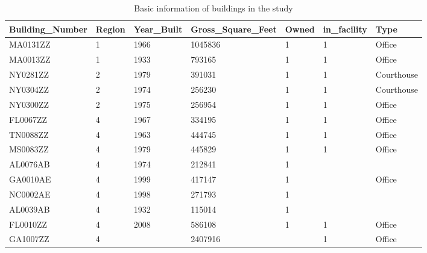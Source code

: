 \documentclass[12pt]{article}
\begin{document}
\FloatBarrier
\begin{longtable}{lllllll}
\caption{Basic information of buildings in the study}\\
\label{tab:basic_info}
Building\_Number & Region & Year\_Built & Gross\_Square\_Feet & Owned & in\_facility & Type \\ \hline \hline \endhead
MA0131ZZ         & 1      & 1966        & 1045836                    & 1     & 1            & Office                           \\
MA0013ZZ         & 1      & 1933        & 793165                     & 1     & 1            & Office                          \\
NY0281ZZ         & 2      & 1979        & 391031                     & 1     & 1            & Courthouse                       \\
NY0304ZZ         & 2      & 1974        & 256230                     & 1     & 1            & Courthouse                       \\
NY0300ZZ         & 2      & 1975        & 256954                     & 1     & 1            & Office                           \\
FL0067ZZ         & 4      & 1967        & 334195                     & 1     & 1            & Office                           \\
TN0088ZZ         & 4      & 1963        & 444745                     & 1     & 1            & Office                           \\
MS0083ZZ         & 4      & 1979        & 445829                     & 1     & 1            & Office                           \\
AL0076AB         & 4      & 1974        & 212841                     & 1     &              &                                  \\
GA0010AE         & 4      & 1999        & 417147                     & 1     &              & Office                           \\
NC0002AE         & 4      & 1998        & 271793                     & 1     &              &                                  \\
AL0039AB         & 4      & 1932        & 115014                     & 1     &              &                                  \\
FL0010ZZ         & 4      & 2008        & 586108                     & 1     & 1            & Office                           \\
GA1007ZZ         & 4      &             & 2407916                    &       & 1            & Office                           \\

\end{longtable}
\end{document}
